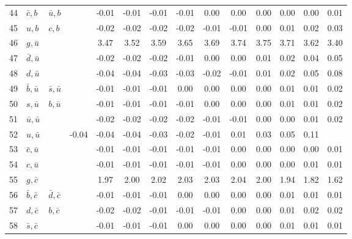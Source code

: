 \begin{tabularx}{\textwidth}{rXXX@{}S@{}S@{}S@{}S@{}S@{}S@{}S@{}S@{}S@{}S}
 44 & $\bar c, b$      & $\bar u, b$       &                  & -0.01 & -0.01 & -0.01 & -0.01 &  0.00 &  0.00 &  0.00 &  0.00 &  0.00 &  0.01 \\
 45 & $u, b$           & $c, b$            &                  & -0.02 & -0.02 & -0.02 & -0.02 & -0.01 & -0.01 &  0.00 &  0.01 &  0.02 &  0.03 \\
 46 & $g, \bar u$      &                   &                  &  3.47 &  3.52 &  3.59 &  3.65 &  3.69 &  3.74 &  3.75 &  3.71 &  3.62 &  3.40 \\
 47 & $\bar d, \bar u$ &                   &                  & -0.02 & -0.02 & -0.02 & -0.01 &  0.00 &  0.00 &  0.01 &  0.02 &  0.04 &  0.05 \\
 48 & $d, \bar u$      &                   &                  & -0.04 & -0.04 & -0.03 & -0.03 & -0.02 & -0.01 &  0.01 &  0.02 &  0.05 &  0.08 \\
 49 & $\bar b, \bar u$ & $\bar s, \bar u$  &                  & -0.01 & -0.01 & -0.01 &  0.00 &  0.00 &  0.00 &  0.00 &  0.01 &  0.01 &  0.02 \\
 50 & $s, \bar u$      & $b, \bar u$       &                  & -0.01 & -0.01 & -0.01 & -0.01 &  0.00 &  0.00 &  0.00 &  0.01 &  0.01 &  0.02 \\
 51 & $\bar u, \bar u$ &                   &                  & -0.02 & -0.02 & -0.02 & -0.02 & -0.01 & -0.01 &  0.00 &  0.00 &  0.01 &  0.02 \\
 52 & $u, \bar u$                          &                  & -0.04 & -0.04 & -0.04 & -0.03 & -0.02 & -0.01 &  0.01 &  0.03 &  0.05 &  0.11 \\
 53 & $\bar c, \bar u$ &                   &                  & -0.01 & -0.01 & -0.01 & -0.01 & -0.01 &  0.00 &  0.00 &  0.00 &  0.00 &  0.01 \\
 54 & $c, \bar u$      &                   &                  & -0.01 & -0.01 & -0.01 & -0.01 & -0.01 &  0.00 &  0.00 &  0.00 &  0.01 &  0.01 \\
 55 & $g, \bar c$      &                   &                  &  1.97 &  2.00 &  2.02 &  2.03 &  2.03 &  2.04 &  2.00 &  1.94 &  1.82 &  1.62 \\
 56 & $\bar b, \bar c$ & $\bar d, \bar c$  &                  & -0.01 & -0.01 & -0.01 &  0.00 &  0.00 &  0.00 &  0.00 &  0.01 &  0.01 &  0.01 \\
 57 & $d, \bar c$      & $b, \bar c$       &                  & -0.02 & -0.02 & -0.01 & -0.01 & -0.01 &  0.00 &  0.00 &  0.01 &  0.02 &  0.02 \\
 58 & $\bar s, \bar c$ &                   &                  & -0.01 & -0.01 & -0.01 &  0.00 &  0.00 &  0.00 &  0.00 &  0.01 &  0.01 &  0.01 \\

\end{tabularx}
